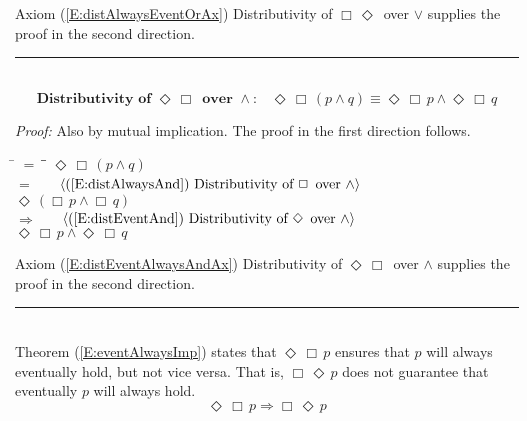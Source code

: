 \documentclass[fleqn, leqno]{article}
\newcommand{\lgap}{2pt}                             %
\newcommand{\mymathindent}{24pt}                    %
\newcommand{\impl}{\ensuremath{\Rightarrow}}        %
\newcommand{\Event}{\Diamond\,}
\newcommand{\Always}{\Box\,}
\newcommand{\myqed}{\rule[-.23ex]{1.2ex}{2.0ex}}
\newcommand{\myqedtab}{\hspace{388.5pt}}              %
\newcommand{\Gll} {\langle}                         %
\newcommand{\Ggg} {\rangle}                         %
\newcommand{\Hint}[1]     {\ \ \ $\Gll              \mbox{#1} \Ggg$ }   %
\begin{document}
Axiom (\ref{E:distAlwaysEventOrAx}) Distributivity of $\Always\Event$ over $\lor$ supplies the proof in the second direction.
\hfill \myqed\\[\lgap]

\begin{equation}\label{E:distEventAlwaysAnd}
\textbf{Distributivity of $\Event\Always$ over $\land$:}\quad \Event\Always(p \land q) \equiv \Event\Always p \land \Event\Always q
\end{equation}

\emph{Proof:} Also by mutual implication.
The proof in the first direction follows.
\begin{tabbing}
\hspace{\mymathindent} \= $= \;$ \= \myqedtab \= \kill
  \> \>   $\Event\Always (p \land q)$\\[\lgap]
  \> $=$  \>  \Hint{(\ref{E:distAlwaysAnd}) Distributivity of $\Always$ over $\land$}\\[\lgap]
  \> \>   $\Event(\Always p \land \Always q)$\\[\lgap]
  \> $\impl$  \>  \Hint{(\ref{E:distEventAnd}) Distributivity of $\Event$ over $\land$}\\[\lgap]
  \> \>   $\Event\Always p \land \Event\Always q$\\[\lgap]
\end{tabbing}

Axiom (\ref{E:distEventAlwaysAndAx}) Distributivity of $\Event\Always$ over $\land$ supplies the proof in the second direction.
\hfill \myqed\\[\lgap]

Theorem (\ref{E:eventAlwaysImp}) states that $\Event\Always p$ ensures that $p$ will always eventually hold, but not vice versa.
That is, $\Always\Event p$ does not guarantee that eventually $p$ will always hold.
\begin{equation}\label{E:eventAlwaysImp}
\Event\Always p \impl \Always\Event p
\end{equation}
\end{document}

